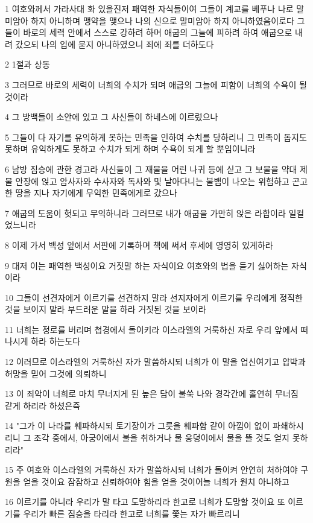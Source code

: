 \par 1 여호와께서 가라사대 화 있을진저 패역한 자식들이여 그들이 계교를 베푸나 나로 말미암아 하지 아니하며 맹약을 맺으나 나의 신으로 말미암아 하지 아니하였음이로다 그들이 바로의 세력 안에서 스스로 강하려 하며 애굽의 그늘에 피하려 하여 애굽으로 내려 갔으되 나의 입에 묻지 아니하였으니 죄에 죄를 더하도다
\par 2 1절과 상동
\par 3 그러므로 바로의 세력이 너희의 수치가 되며 애굽의 그늘에 피함이 너희의 수욕이 될 것이라
\par 4 그 방백들이 소안에 있고 그 사신들이 하네스에 이르렀으나
\par 5 그들이 다 자기를 유익하게 못하는 민족을 인하여 수치를 당하리니 그 민족이 돕지도 못하며 유익하게도 못하고 수치가 되게 하며 수욕이 되게 할 뿐임이니라
\par 6 남방 짐승에 관한 경고라 사신들이 그 재물을 어린 나귀 등에 싣고 그 보물을 약대 제물 안장에 얹고 암사자와 수사자와 독사와 및 날아다니는 불뱀이 나오는 위험하고 곤고한 땅을 지나 자기에게 무익한 민족에게로 갔으나
\par 7 애굽의 도움이 헛되고 무익하니라 그러므로 내가 애굽을 가만히 앉은 라합이라 일컬었느니라
\par 8 이제 가서 백성 앞에서 서판에 기록하며 책에 써서 후세에 영영히 있게하라
\par 9 대저 이는 패역한 백성이요 거짓말 하는 자식이요 여호와의 법을 듣기 싫어하는 자식이라
\par 10 그들이 선견자에게 이르기를 선견하지 말라 선지자에게 이르기를 우리에게 정직한 것을 보이지 말라 부드러운 말을 하라 거짓된 것을 보이라
\par 11 너희는 정로를 버리며 첩경에서 돌이키라 이스라엘의 거룩하신 자로 우리 앞에서 떠나시게 하라 하는도다
\par 12 이러므로 이스라엘의 거룩하신 자가 말씀하시되 너희가 이 말을 업신여기고 압박과 허망을 믿어 그것에 의뢰하니
\par 13 이 죄악이 너희로 마치 무너지게 된 높은 담이 불쑥 나와 경각간에 홀연히 무너짐 같게 하리라 하셨은즉
\par 14 "그가 이 나라를 훼파하시되 토기장이가 그릇을 훼파함 같이 아낌이 없이 파쇄하시리니 그 조각 중에서, 아궁이에서 불을 취하거나 물 웅덩이에서 물을 뜰 것도 얻지 못하리라"
\par 15 주 여호와 이스라엘의 거룩하신 자가 말씀하시되 너희가 돌이켜 안연히 처하여야 구원을 얻을 것이요 잠잠하고 신뢰하여야 힘을 얻을 것이어늘 너희가 원치 아니하고
\par 16 이르기를 아니라 우리가 말 타고 도망하리라 한고로 너희가 도망할 것이요 또 이르기를 우리가 빠른 짐승을 타리라 한고로 너희를 쫓는 자가 빠르리니
